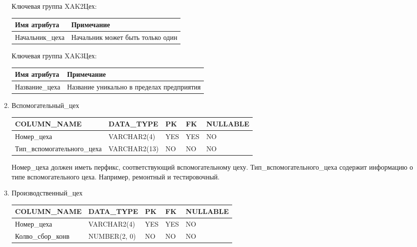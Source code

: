 \begin{enumerate}
    Ключевая группа XAK2Цех:

    \begin{tabular}{|p{7cm}|p{9.3cm}|} \hline

        {\bf Имя атрибута} & {\bf Примечание} \\ \hline
        Начальник\_цеха & Начальник может быть только один \\ \hline

    \end{tabular}

    Ключевая группа XAK3Цех:

    \begin{tabular}{|p{7cm}|p{9.3cm}|} \hline

        {\bf Имя атрибута} & {\bf Примечание} \\ \hline
        Название\_цеха & Название уникально в пределах предприятия \\ \hline

    \end{tabular}

    \item{Вспомогательный\_цех}

    \begin{tabular}{|p{7cm}|p{3cm}|p{1cm}|p{1cm}|p{3cm}|} \hline

        {\bf COLUMN\_NAME} & {\bf DATA\_TYPE} & {\bf PK} & {\bf FK} & {\bf NULLABLE} \\ \hline
        Номер\_цеха & VARCHAR2(4) & YES & YES & NO \\ \hline
        Тип\_вспомогательного\_цеха & VARCHAR2(13) & NO & NO & NO \\ \hline

    \end{tabular}

    Номер\_цеха должен иметь перфикс, соответствующий вспомогательному цеху.
    Тип\_вспомогательного\_цеха содержит информацию о типе вспомогательного цеха.
    Например, ремонтный и тестировочный.

    \item{Производственный\_цех}

    \begin{tabular}{|p{7cm}|p{3cm}|p{1cm}|p{1cm}|p{3cm}|} \hline

        {\bf COLUMN\_NAME} & {\bf DATA\_TYPE} & {\bf PK} & {\bf FK} & {\bf NULLABLE} \\ \hline
        Номер\_цеха & VARCHAR2(4) & YES & YES & NO \\ \hline
        Колво\_сбор\_конв & NUMBER(2, 0) & NO & NO & NO \\ \hline


\end{tabular}
\end{enumerate}

